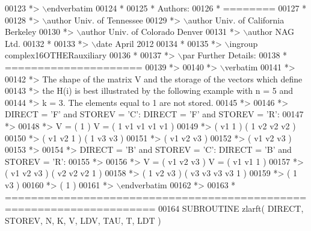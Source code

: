 \begin{DoxyCode}
00123 \textcolor{comment}{*> \(\backslash\)endverbatim}
00124 \textcolor{comment}{*}
00125 \textcolor{comment}{*  Authors:}
00126 \textcolor{comment}{*  ========}
00127 \textcolor{comment}{*}
00128 \textcolor{comment}{*> \(\backslash\)author Univ. of Tennessee }
00129 \textcolor{comment}{*> \(\backslash\)author Univ. of California Berkeley }
00130 \textcolor{comment}{*> \(\backslash\)author Univ. of Colorado Denver }
00131 \textcolor{comment}{*> \(\backslash\)author NAG Ltd. }
00132 \textcolor{comment}{*}
00133 \textcolor{comment}{*> \(\backslash\)date April 2012}
00134 \textcolor{comment}{*}
00135 \textcolor{comment}{*> \(\backslash\)ingroup complex16OTHERauxiliary}
00136 \textcolor{comment}{*}
00137 \textcolor{comment}{*> \(\backslash\)par Further Details:}
00138 \textcolor{comment}{*  =====================}
00139 \textcolor{comment}{*>}
00140 \textcolor{comment}{*> \(\backslash\)verbatim}
00141 \textcolor{comment}{*>}
00142 \textcolor{comment}{*>  The shape of the matrix V and the storage of the vectors which define}
00143 \textcolor{comment}{*>  the H(i) is best illustrated by the following example with n = 5 and}
00144 \textcolor{comment}{*>  k = 3. The elements equal to 1 are not stored.}
00145 \textcolor{comment}{*>}
00146 \textcolor{comment}{*>  DIRECT = 'F' and STOREV = 'C':         DIRECT = 'F' and STOREV = 'R':}
00147 \textcolor{comment}{*>}
00148 \textcolor{comment}{*>               V = (  1       )                 V = (  1 v1 v1 v1 v1 )}
00149 \textcolor{comment}{*>                   ( v1  1    )                     (     1 v2 v2 v2 )}
00150 \textcolor{comment}{*>                   ( v1 v2  1 )                     (        1 v3 v3 )}
00151 \textcolor{comment}{*>                   ( v1 v2 v3 )}
00152 \textcolor{comment}{*>                   ( v1 v2 v3 )}
00153 \textcolor{comment}{*>}
00154 \textcolor{comment}{*>  DIRECT = 'B' and STOREV = 'C':         DIRECT = 'B' and STOREV = 'R':}
00155 \textcolor{comment}{*>}
00156 \textcolor{comment}{*>               V = ( v1 v2 v3 )                 V = ( v1 v1  1       )}
00157 \textcolor{comment}{*>                   ( v1 v2 v3 )                     ( v2 v2 v2  1    )}
00158 \textcolor{comment}{*>                   (  1 v2 v3 )                     ( v3 v3 v3 v3  1 )}
00159 \textcolor{comment}{*>                   (     1 v3 )}
00160 \textcolor{comment}{*>                   (        1 )}
00161 \textcolor{comment}{*> \(\backslash\)endverbatim}
00162 \textcolor{comment}{*>}
00163 \textcolor{comment}{*  =====================================================================}
00164 \textcolor{keyword}{      SUBROUTINE }zlarft( DIRECT, STOREV, N, K, V, LDV, TAU, T, LDT )

\end{DoxyCode}
